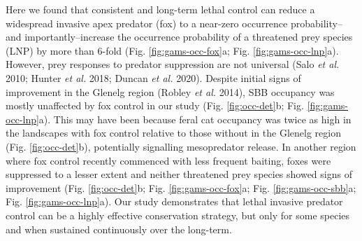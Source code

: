 \documentclass[11pt,a4paper,titlepage,twoside,openright]{style/unimelbthesis}
\begin{document}
\begin{mainmatter}
Here we found that consistent and long-term lethal control can reduce a widespread invasive apex predator (fox) to a near-zero occurrence probability--and importantly--increase the occurrence probability of a threatened prey species (LNP) by more than 6-fold (Fig. \ref{fig:gams-occ-fox}a; Fig. \ref{fig:gams-occ-lnp}a). However, prey responses to predator suppression are not universal (Salo \emph{et al.} 2010; Hunter \emph{et al.} 2018; Duncan \emph{et al.} 2020). Despite initial signs of improvement in the Glenelg region (Robley \emph{et al.} 2014), SBB occupancy was mostly unaffected by fox control in our study (Fig. \ref{fig:occ-det}b; Fig. \ref{fig:gams-occ-lnp}a). This may have been because feral cat occupancy was twice as high in the landscapes with fox control relative to those without in the Glenelg region (Fig. \ref{fig:occ-det}b), potentially signalling mesopredator release. In another region where fox control recently commenced with less frequent baiting, foxes were suppressed to a lesser extent and neither threatened prey species showed signs of improvement (Fig. \ref{fig:occ-det}b; Fig. \ref{fig:gams-occ-fox}a; Fig. \ref{fig:gams-occ-sbb}a; Fig. \ref{fig:gams-occ-lnp}a). Our study demonstrates that lethal invasive predator control can be a highly effective conservation strategy, but only for some species and when sustained continuously over the long-term.


\end{mainmatter}
\end{document}
